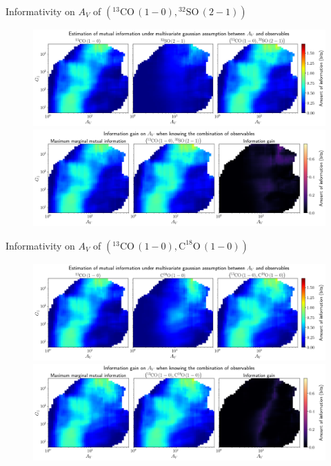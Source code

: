 \documentclass{beamer}
\begin{document}
\begin{frame}{Informativity on $A_V$ of $\left(\mathrm{^{13}CO\,(1-0)},\mathrm{^{32}SO\,(2-1)}\right)$}
    \begin{figure}
        \centering
        \includegraphics[width=0.95\linewidth]{../linearinfogauss/av__13co10_32so21_linearinfogauss.png}
        \vfill
        \includegraphics[width=0.95\linewidth]{../linearinfogauss/av__13co10_32so21_linearinfogauss_gain.png}
    \end{figure}
\end{frame}

\begin{frame}{Informativity on $A_V$ of $\left(\mathrm{^{13}CO\,(1-0)},\mathrm{C^{18}O\,(1-0)}\right)$}
    \begin{figure}
        \centering
        \includegraphics[width=0.95\linewidth]{../linearinfogauss/av__13co10_c18o10_linearinfogauss.png}
        \vfill
        \includegraphics[width=0.95\linewidth]{../linearinfogauss/av__13co10_c18o10_linearinfogauss_gain.png}
    \end{figure}
\end{frame}
\end{document}
